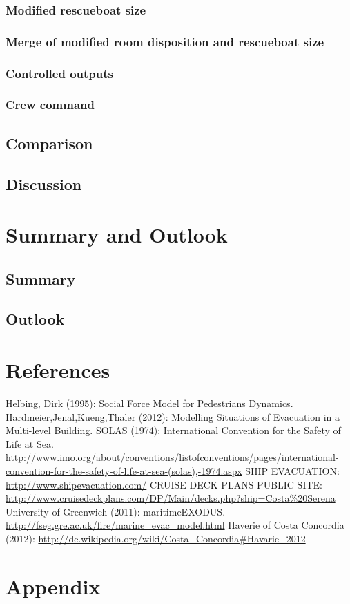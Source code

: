 \documentclass[11pt]{article}
\begin{document}
\subsubsection{Modified rescueboat size}
\subsubsection{Merge of modified room disposition and rescueboat size}
\subsubsection{Controlled outputs}
\subsubsection{Crew command}
\subsection{Comparison}
\subsection{Discussion}
\section{Summary and Outlook}
\subsection{Summary}
\subsection{Outlook}
\section{References}

\begin{thebibliography}{9}
 Helbing, Dirk (1995): Social Force Model for Pedestrians Dynamics.
 Hardmeier,Jenal,Kueng,Thaler (2012): Modelling Situations of Evacuation in a Multi-level Building.
 SOLAS (1974): International Convention for the Safety of Life at Sea. \url{http://www.imo.org/about/conventions/listofconventions/pages/international-convention-for-the-safety-of-life-at-sea-(solas),-1974.aspx}
 SHIP EVACUATION: \url{http://www.shipevacuation.com/}
 CRUISE DECK PLANS PUBLIC SITE: \url{http://www.cruisedeckplans.com/DP/Main/decks.php?ship=Costa%20Serena}
 University of Greenwich (2011):  maritimeEXODUS. \url{http://fseg.gre.ac.uk/fire/marine_evac_model.html}
 Haverie of Costa Concordia (2012): \url{http://de.wikipedia.org/wiki/Costa_Concordia#Havarie_2012}
	
\end{thebibliography}
\section{Appendix}
\end{document}
